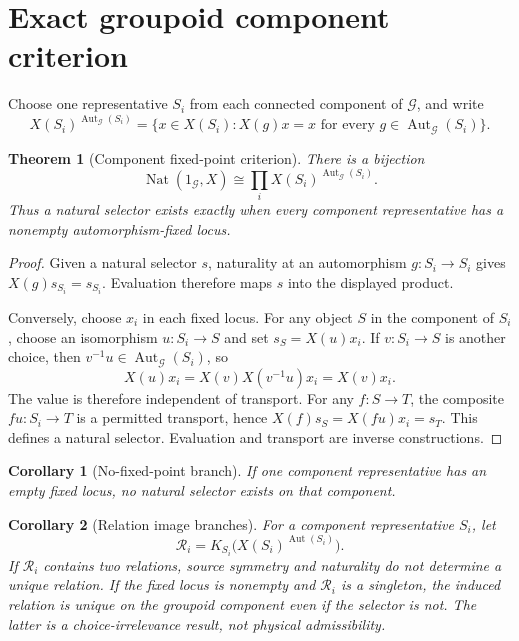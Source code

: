 \documentclass[11pt]{article}
\newtheorem{theorem}{Theorem}
\newtheorem{corollary}{Corollary}
\newcommand{\Aut}{\operatorname{Aut}}
\begin{document}
\section{Exact groupoid component criterion}

Choose one representative \(S_i\) from each connected component of
\(\mathcal G\), and write
\[
 X(S_i)^{\Aut_{\mathcal G}(S_i)}
 =\{x\in X(S_i):X(g)x=x\text{ for every }g\in\Aut_{\mathcal G}(S_i)\}.
\]

\begin{theorem}[Component fixed-point criterion]
There is a bijection
\[
 \operatorname{Nat}(1_{\mathcal G},X)
 \cong
 \prod_i X(S_i)^{\Aut_{\mathcal G}(S_i)}.
\]
Thus a natural selector exists exactly when every component representative
has a nonempty automorphism-fixed locus.
\end{theorem}

\begin{proof}
Given a natural selector \(s\), naturality at an automorphism
\(g:S_i\to S_i\) gives \(X(g)s_{S_i}=s_{S_i}\). Evaluation therefore maps
\(s\) into the displayed product.

Conversely, choose \(x_i\) in each fixed locus. For any object \(S\) in the
component of \(S_i\), choose an isomorphism \(u:S_i\to S\) and set
\(s_S=X(u)x_i\). If \(v:S_i\to S\) is another choice, then
\(v^{-1}u\in\Aut_{\mathcal G}(S_i)\), so
\[
 X(u)x_i=X(v)X(v^{-1}u)x_i=X(v)x_i.
\]
The value is therefore independent of transport. For any \(f:S\to T\),
the composite \(fu:S_i\to T\) is a permitted transport, hence
\(X(f)s_S=X(fu)x_i=s_T\). This defines a natural selector. Evaluation and
transport are inverse constructions.
\end{proof}

\begin{corollary}[No-fixed-point branch]
If one component representative has an empty fixed locus, no natural
selector exists on that component.
\end{corollary}

\begin{corollary}[Relation image branches]
For a component representative \(S_i\), let
\[
 \mathcal R_i=K_{S_i}\bigl(X(S_i)^{\Aut(S_i)}\bigr).
\]
If \(\mathcal R_i\) contains two relations, source symmetry and naturality do
not determine a unique relation. If the fixed locus is nonempty and
\(\mathcal R_i\) is a singleton, the induced relation is unique on the
groupoid component even if the selector is not. The latter is a
choice-irrelevance result, not physical admissibility.
\end{corollary}
\end{document}
